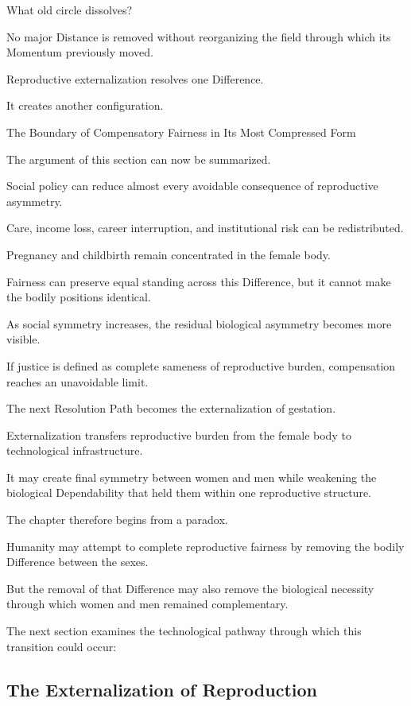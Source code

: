 What old circle dissolves?

No major Distance is removed without reorganizing the field through which its Momentum previously moved.

Reproductive externalization resolves one Difference.

It creates another configuration.

The Boundary of Compensatory Fairness in Its Most Compressed Form

The argument of this section can now be summarized.

Social policy can reduce almost every avoidable consequence of reproductive asymmetry.

Care, income loss, career interruption, and institutional risk can be redistributed.

Pregnancy and childbirth remain concentrated in the female body.

Fairness can preserve equal standing across this Difference, but it cannot make the bodily positions identical.

As social symmetry increases, the residual biological asymmetry becomes more visible.

If justice is defined as complete sameness of reproductive burden, compensation reaches an unavoidable limit.

The next Resolution Path becomes the externalization of gestation.

Externalization transfers reproductive burden from the female body to technological infrastructure.

It may create final symmetry between women and men while weakening the biological Dependability that held them within one reproductive structure.

The chapter therefore begins from a paradox.

Humanity may attempt to complete reproductive fairness by removing the bodily Difference between the sexes.

But the removal of that Difference may also remove the biological necessity through which women and men remained complementary.

The next section examines the technological pathway through which this transition could occur:

\subsection*{\textbf{The Externalization of Reproduction}}

